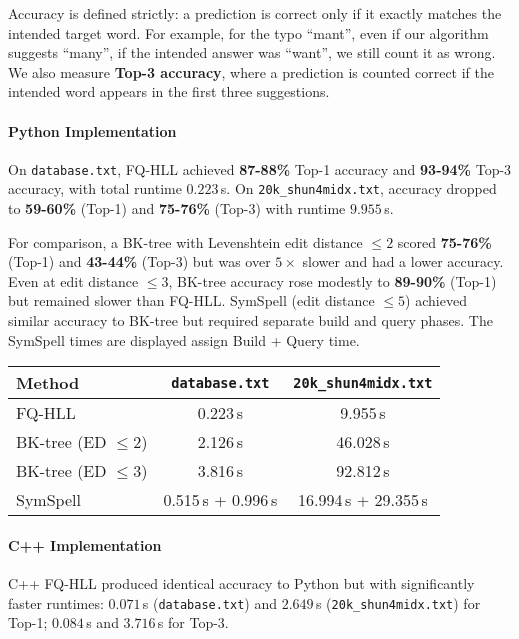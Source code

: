 \documentclass[12pt,a4paper]{article}
\begin{document}
Accuracy is defined strictly: a prediction is correct only if it exactly matches the intended target word. For example, for the typo ``mant'', even if our algorithm suggests ``many'', if the intended answer was ``want'', we still count it as wrong. We also measure \textbf{Top-3 accuracy}, where a prediction is counted correct if the intended word appears in the first three suggestions.

\paragraph{Python Implementation}
On \texttt{database.txt}, FQ-HLL achieved \textbf{87-88\%} Top-1 accuracy and \textbf{93-94\%} Top-3 accuracy, with total runtime $0.223$\,s. On \texttt{20k\_shun4midx.txt}, accuracy dropped to \textbf{59-60\%} (Top-1) and \textbf{75-76\%} (Top-3) with runtime $9.955$\,s. \newline

For comparison, a BK-tree with Levenshtein edit distance $\leq 2$ scored \textbf{75-76\%} (Top-1) and \textbf{43-44\%} (Top-3) but was over $5\times$ slower and had a lower accuracy. Even at edit distance $\leq 3$, BK-tree accuracy rose modestly to \textbf{89-90\%} (Top-1) but remained slower than FQ-HLL. SymSpell (edit distance $\leq 5$) achieved similar accuracy to BK-tree but required separate build and query phases. The SymSpell times are displayed assign Build + Query time.

\begin{center}
  \begin{tabular}{lcc}
    \toprule
    \textbf{Method} & \texttt{database.txt} & \texttt{20k\_shun4midx.txt} \\
    \midrule
    FQ-HLL & 0.223\,s & 9.955\,s \\
    BK-tree (ED $\leq 2$) & 2.126\,s & 46.028\,s \\
    BK-tree (ED $\leq 3$) & 3.816\,s & 92.812\,s \\
    SymSpell & 0.515\,s + 0.996\,s & 16.994\,s + 29.355\,s \\
    \bottomrule
  \end{tabular}
\end{center}

\paragraph{C++ Implementation}
C++ FQ-HLL produced identical accuracy to Python but with significantly faster runtimes: $0.071$\,s (\texttt{database.txt}) and $2.649$\,s (\texttt{20k\_shun4midx.txt}) for Top-1; $0.084$\,s and $3.716$\,s for Top-3.
\end{document}
